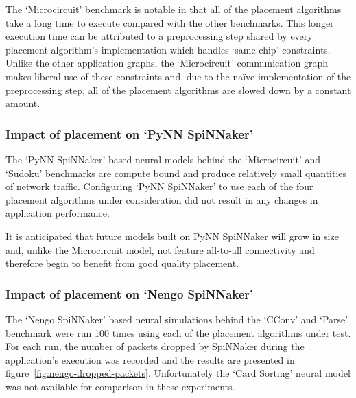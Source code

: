 				The `Microcircuit' benchmark is notable in that all of the placement
				algorithms take a long time to execute compared with the other
				benchmarks. This longer execution time can be attributed to a
				preprocessing step shared by every placement algorithm's implementation
				which handles `same chip' constraints. Unlike the other application
				graphs, the `Microcircuit' communication graph makes liberal use of
				these constraints and, due to the na\"ive implementation of the
				preprocessing step, all of the placement algorithms are slowed down by
				a constant amount.
			
			\subsubsection{Impact of placement on `PyNN SpiNNaker'}
				
				The `PyNN SpiNNaker' based neural models behind the `Microcircuit' and
				`Sudoku' benchmarks are compute bound and produce relatively small
				quantities of network traffic. Configuring `PyNN SpiNNaker' to use each
				of the four placement algorithms under consideration did not result in
				any changes in application performance.
				
				It is anticipated that future models built on PyNN SpiNNaker will grow
				in size and, unlike the Microcircuit model, not feature all-to-all
				connectivity and therefore begin to benefit from good quality
				placement.
			
			\subsubsection{Impact of placement on `Nengo SpiNNaker'}
				
				The `Nengo SpiNNaker' based neural simulations behind the `CConv' and
				`Parse' benchmark were run \num{100} times using each of the placement
				algorithms under test. For each run, the number of packets dropped by
				SpiNNaker during the application's execution was recorded and the
				results are presented in figure~\ref{fig:nengo-dropped-packets}.
				Unfortunately the `Card Sorting' neural model was not available for
				comparison in these experiments.
				
